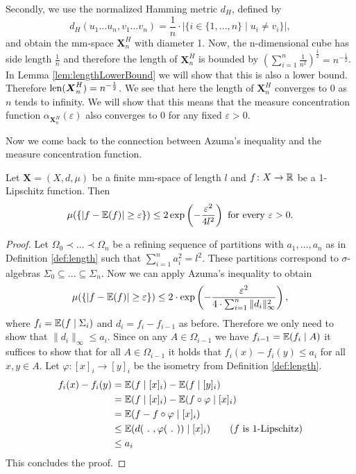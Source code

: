 \begin{example}
	Secondly, we use the normalized Hamming metric $d_H$, defined by 
	\[d_H(u_1\dots u_n,v_1\dots v_n)=\frac{1}{n}\cdot|\{i\in\{1,\dots,n\}\mid u_i\not=v_i\}|,\] and obtain the mm-space $\boldsymbol{X}^H_n$ with diameter 1. Now, the n-dimensional cube has side length $\frac{1}{n}$ and therefore the length of $\boldsymbol{X}^H_n$ is bounded by $(\sum_{i=1}^{n}\frac{1}{n^2})^{\frac{1}{2}}=n^{-\frac{1}{2}}$. In Lemma \ref{lem:lengthLowerBound} we will show that this is also a lower bound. Therefore $\operatorname{len}(\boldsymbol{X}^H_n)=n^{-\frac{1}{2}}$. We see that here the length of $\boldsymbol{X}^H_n$ converges to 0 as $n$ tends to infinity. We will show that this means that the measure concentration function $\alpha_{\boldsymbol{X}^H_n}(\varepsilon)$ also converges to 0 for any fixed $\varepsilon>0$. 
\end{example}
		
Now we come back to the connection between Azuma's inequality and the measure concentration function.
		
\begin{lemma}\label{lem:lipschitz}
	Let $\boldsymbol{X}=(X,d,\mu)$ be a finite mm-space of length $l$ and $f\colon X\to\mathbb{R}$ be a 1-Lipschitz function. Then
	\[\mu(\{|f-\mathbb{E}(f)|\geq\varepsilon\})\leq 2\exp\left(-\frac{\varepsilon^2}{4l^2}\right)\text{ for every $\varepsilon>0$.}\] 
\end{lemma}
\begin{proof}
	Let 
	$\Omega_0\prec\dots\prec\Omega_n$
	be a refining sequence of partitions with $a_1,\dots,a_n$ as in Definition \ref{def:length} such that $\sum_{i=1}^{n}a_i^2=l^2$. These partitions correspond to $\sigma$-algebras $\Sigma_0\subseteq\dots\subseteq\Sigma_n$. Now we can apply Azuma's inequality to obtain
	\[\mu(\{|f-\mathbb{E}(f)|\geq \varepsilon\})\leq 2\cdot\exp\left(-\frac{\varepsilon^2}{4\cdot\sum_{i=1}^{n}\|d_i\|^2_\infty}\right),\]
	where $f_i=\mathbb{E}(f\mid \Sigma_i)$ and $d_i=f_i-f_{i-1}$ as before. Therefore we only need to show that $\|d_i\|_\infty\leq a_i$. Since on any $A\in\Omega_{i-1}$ we have $f_{i-1}=\mathbb{E}(f_i\mid A)$ it suffices to show that for all $A\in\Omega_{i-1}$ it holds that $f_i(x)-f_i(y)\leq a_i$ for all $x,y\in A$.
	Let $\varphi\colon [x]_i\to [y]_i$ be the isometry from Definition \ref{def:length}.
	\begin{align*}
		f_i(x)-f_i(y) & =\mathbb{E}(f\mid [x]_i)-\mathbb{E}(f\mid [y]_i)                                   \\
		              & =\mathbb{E}(f\mid [x]_i)-\mathbb{E}(f\circ\varphi\mid [x]_i)                       \\
		              & =\mathbb{E}(f-f\circ\varphi\mid [x]_i)                                     \\
		              & \leq \mathbb{E}(d(\ .\ ,\varphi(\ .\ ))\mid [x]_i)\tag{$f$ is 1-Lipschitz} \\
		              & \leq a_i                                                        
	\end{align*}
	This concludes the proof.
\end{proof}
		
